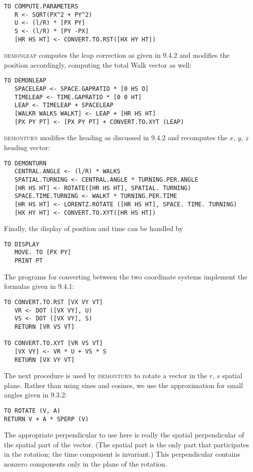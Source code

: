 \documentclass{book}
\begin{document}
\begin{verbatim}
TO COMPUTE.PARAMETERS
   R <- SQRT(PX^2 + PY^2)
   U <- (l/R) * [PX PY]
   S <- (l/R) * [PY -PX]
   [HR HS HT] <- CONVERT.TO.RST([HX HY HT])
\end{verbatim}
\textsc{demonleap} computes the leap correction as given in 9.4.2 and modifies
the position accordingly, computing the total Walk vector as well:

\begin{verbatim}
TO DEMONLEAP
   SPACELEAP <- SPACE.GAPRATIO * [0 HS O]
   TIMELEAP <- TIME.GAPRATIO * [0 0 HT]
   LEAP <- TIMELEAP + SPACELEAP
   [WALKR WALKS WALKT] <- LEAP + [HR HS HT]
   [PX PY PT] <- [PX PY PT] + CONVERT.TO.XYT (LEAP)
\end{verbatim}
\textsc{demonturn} modifies the heading as discussed in 9.4.2 and recomputes
the $x$, $y$, $z$ heading vector:

\begin{verbatim}
TO DEMONTURN
   CENTRAL.ANGLE <- (l/R) * WALKS
   SPATIAL.TURNING <- CENTRAL.ANGLE * TURNING.PER.ANGLE
   [HR HS HT] <- ROTATE([HR HS HT], SPATIAL. TURNING)
   SPACE.TIME.TURNING <- WALKT * TURNING.PER.TIME
   [HR HS HT] <- LORENTZ.ROTATE ([HR HS HT], SPACE. TIME. TURNING)
   [HX HY HT] <- CONVERT.TO.XYT([HR HS HT])
\end{verbatim}
Finally, the display of position and time can be handled by

\begin{verbatim}
TO DISPLAY
   MOVE. TO [PX PY]
   PRINT PT
\end{verbatim}
The programs for converting between the two coordinate systems implement the formulas given in 9.4.1:

\begin{verbatim}
TO CONVERT.TO.RST [VX VY VT]
   VR <- DOT ([VX VY], U)
   VS <- DOT ([VX VY], S)
   RETURN [VR VS VT]

TO CONVERT.TO.XYT [VR VS VT]
   [VX VY] <- VR * U + VS * S
   RETURN [VX VY VT]
\end{verbatim}
The next procedure is used by \textsc{demonturn} to rotate a vector in the
$r$, $s$ spatial plane. Rather than using sines and cosines, we use the
approximation for small angles given in 9.3.2:

\begin{verbatim}
TO ROTATE (V, A)
RETURN V + A * SPERP (V)
\end{verbatim}
The appropriate perpendicular to use here is really the spatial perpendicular of the spatial part of the vector. (The spatial part is the only
part that participates in the rotation; the time component is invariant.)
This perpendicular contains nonzero components only in the plane of
the rotation.
\end{document}
